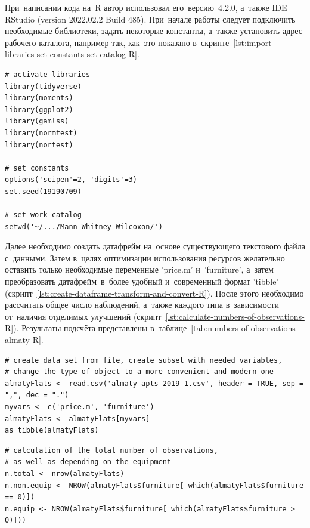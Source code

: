 \documentclass[]{scrreprt}
\begin{document}
При~написании кода на~R автор использовал его~версию~4.2.0, а~также \foreignlanguage{english}{IDE RStudio (version 2022.02.2 Build 485)}. При~начале работы следует подключить необходимые библиотеки, задать некоторые константы, а~также установить адрес рабочего каталога, например так, как~это показано в~скрипте~\ref{lst:import-libraries-set-constants-set-catalog-R}.
%
\begin{lstlisting}[float, caption = Подключение библиотек и~задание значений констант и~адреса рабочего каталога, firstnumber=1, label= lst:import-libraries-set-constants-set-catalog-R]
# activate libraries
library(tidyverse)
library(moments)
library(ggplot2)
library(gamlss)
library(normtest)
library(nortest)

# set constants
options('scipen'=2, 'digits'=3)
set.seed(19190709)

# set work catalog
setwd('~/.../Mann-Whitney-Wilcoxon/')
\end{lstlisting}  
%

Далее необходимо создать датафрейм на~основе существующего текстового файла с~данными. Затем в~целях оптимизации использования ресурсов желательно оставить только необходимые переменные 'price.m' и~'furniture', а~затем преобразовать датафрейм~в~более удобный и~современный формат 'tibble' (скрипт~\ref{lst:create-dataframe-transform-and-convert-R}). После этого необходимо рассчитать общее число наблюдений, а~также каждого типа в~зависимости от~наличия отделимых улучшений (скрипт~\ref{lst:calculate-numbers-of-observations-R}). Результаты подсчёта представлены в~таблице~\ref{tab:numbers-of-observations-almaty-R}.
%
\begin{lstlisting}[float, caption = Создание датафрейма и его настройка, firstnumber=1, label= lst:create-dataframe-transform-and-convert-R]
# create data set from file, create subset with needed variables,
# change the type of object to a more convenient and modern one
almatyFlats <- read.csv('almaty-apts-2019-1.csv', header = TRUE, sep = ",", dec = ".")
myvars <- c('price.m', 'furniture')
almatyFlats <- almatyFlats[myvars]
as_tibble(almatyFlats)
\end{lstlisting} 
%
\begin{lstlisting}[float, caption = Подсчёт количества наблюдений, firstnumber=1, label= lst:calculate-numbers-of-observations-R]
# calculation of the total number of observations,
# as well as depending on the equipment 
n.total <- nrow(almatyFlats)
n.non.equip <- NROW(almatyFlats$furniture[ which(almatyFlats$furniture == 0)])
n.equip <- NROW(almatyFlats$furniture[ which(almatyFlats$furniture > 0)]))
\end{lstlisting}
%
\end{document}
